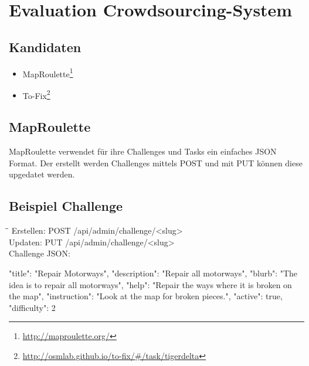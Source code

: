 \newpage
\section{Evaluation Crowdsourcing-System}
\subsection{Kandidaten}
\begin{itemize}
	\item MapRoulette\footnote{\url{http://maproulette.org/}} 
	\item To-Fix\footnote{\url{http://osmlab.github.io/to-fix/\#/task/tigerdelta}}
\end{itemize}

\subsection{MapRoulette}
MapRoulette verwendet für ihre Challenges und Tasks ein einfaches JSON Format. Der erstellt werden Challenges mittels POST und mit PUT können diese upgedatet werden.

\subsection*{Beispiel Challenge}
\begin{tabbing}
    \hspace*{4cm}\=\hspace*{5cm}\= \kill
    Erstellen: \> POST /api/admin/challenge/<slug>  \\
    Updaten: \> PUT /api/admin/challenge/<slug> \\
    Challenge JSON: \\
\end{tabbing}		
\begin{python}
{
  "title": "Repair Motorways",
  "description": "Repair all motorways",
  "blurb": "The idea is to repair all motorways",
  "help": "Repair the ways where it is broken on the map",
  "instruction": "Look at the map for broken pieces.",
  "active": true,
  "difficulty": 2
}
\end{python}

